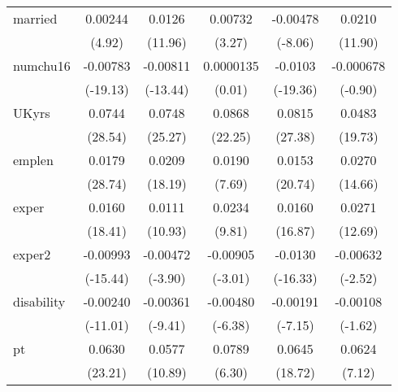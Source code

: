 \begin{table}[htbp]
\begin{tabular}{l*{5}{c}}
married     &     0.00244\sym{***}&      0.0126\sym{***}&     0.00732\sym{**} &    -0.00478\sym{***}&      0.0210\sym{***}\\
            &      (4.92)         &     (11.96)         &      (3.27)         &     (-8.06)         &     (11.90)         \\
numchu16    &    -0.00783\sym{***}&    -0.00811\sym{***}&   0.0000135         &     -0.0103\sym{***}&   -0.000678         \\
            &    (-19.13)         &    (-13.44)         &      (0.01)         &    (-19.36)         &     (-0.90)         \\
UKyrs       &      0.0744\sym{***}&      0.0748\sym{***}&      0.0868\sym{***}&      0.0815\sym{***}&      0.0483\sym{***}\\
            &     (28.54)         &     (25.27)         &     (22.25)         &     (27.38)         &     (19.73)         \\
emplen      &      0.0179\sym{***}&      0.0209\sym{***}&      0.0190\sym{***}&      0.0153\sym{***}&      0.0270\sym{***}\\
            &     (28.74)         &     (18.19)         &      (7.69)         &     (20.74)         &     (14.66)         \\
exper       &      0.0160\sym{***}&      0.0111\sym{***}&      0.0234\sym{***}&      0.0160\sym{***}&      0.0271\sym{***}\\
            &     (18.41)         &     (10.93)         &      (9.81)         &     (16.87)         &     (12.69)         \\
exper2      &    -0.00993\sym{***}&    -0.00472\sym{***}&    -0.00905\sym{**} &     -0.0130\sym{***}&    -0.00632\sym{*}  \\
            &    (-15.44)         &     (-3.90)         &     (-3.01)         &    (-16.33)         &     (-2.52)         \\
disability  &    -0.00240\sym{***}&    -0.00361\sym{***}&    -0.00480\sym{***}&    -0.00191\sym{***}&    -0.00108         \\
            &    (-11.01)         &     (-9.41)         &     (-6.38)         &     (-7.15)         &     (-1.62)         \\
pt          &      0.0630\sym{***}&      0.0577\sym{***}&      0.0789\sym{***}&      0.0645\sym{***}&      0.0624\sym{***}\\
            &     (23.21)         &     (10.89)         &      (6.30)         &     (18.72)         &      (7.12)         \\

\end{tabular}
\end{table}

